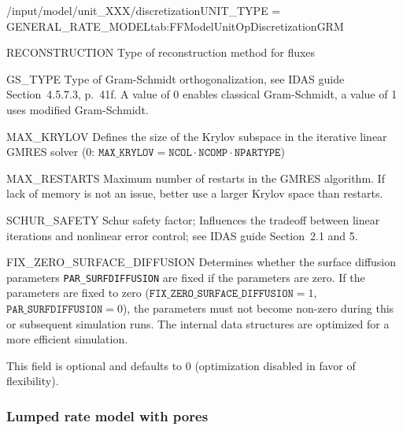 \begin{condsubgroup}{/input/model/unit\_XXX/discretization}{UNIT\_TYPE = GENERAL\_RATE\_MODEL}{tab:FFModelUnitOpDiscretizationGRM}
\begin{dataset}[type=string,range={\texttt{WENO}},length={1}]{RECONSTRUCTION}
    Type of reconstruction method for fluxes
  \end{dataset}
  \begin{dataset}[type=int,range={$\{0, 1\}$},length=1]{GS\_TYPE}
    Type of Gram-Schmidt orthogonalization, see IDAS guide Section~4.5.7.3, p.~41f.
    A value of $0$ enables classical Gram-Schmidt, a value of 1 uses modified Gram-Schmidt.
  \end{dataset}
  \begin{dataset}[type=int,range={$\{0, \dots, \texttt{NCOL} \cdot \texttt{NCOMP} \cdot \texttt{NPARTYPE} \}$},length=1]{MAX\_KRYLOV}
    Defines the size of the Krylov subspace in the iterative linear GMRES solver (0: $\texttt{MAX\_KRYLOV} = \texttt{NCOL} \cdot \texttt{NCOMP} \cdot \texttt{NPARTYPE}$)
  \end{dataset}
  \begin{dataset}[type=int,range={$\geq 0$},length=1]{MAX\_RESTARTS}
    Maximum number of restarts in the GMRES algorithm. If lack of memory is not an issue, better use a larger Krylov space than restarts.
  \end{dataset}
  \begin{dataset}[type=double,range={$\geq 0$},length=1]{SCHUR\_SAFETY}
    Schur safety factor; Influences the tradeoff between linear iterations and nonlinear error control; see IDAS guide Section~2.1 and 5.
  \end{dataset}
  \begin{dataset}[type=int,range={$\{0, 1\}$},length=1]{FIX\_ZERO\_SURFACE\_DIFFUSION}
    Determines whether the surface diffusion parameters \texttt{PAR\_SURFDIFFUSION} are fixed if the parameters are zero.
    If the parameters are fixed to zero ($\texttt{FIX\_ZERO\_SURFACE\_DIFFUSION} = 1$, $\texttt{PAR\_SURFDIFFUSION} = 0$), the parameters must not become non-zero during this or subsequent simulation runs.
    The internal data structures are optimized for a more efficient simulation.

    This field is optional and defaults to $0$ (optimization disabled in favor of flexibility).
  \end{dataset}
\end{condsubgroup}

\subsubsection{Lumped rate model with pores}

